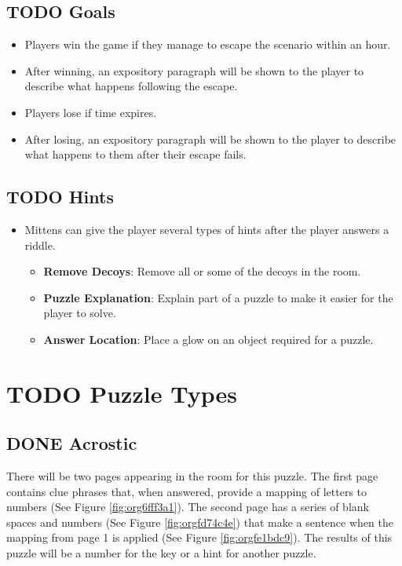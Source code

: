 \documentclass[11pt]{article}
\begin{document}
\subsection{{\bfseries\sffamily TODO} Goals}
\label{sec:org3f1af4b}
\begin{itemize}
\item Players win the game if they manage to escape the scenario within an hour.
\item After winning, an expository paragraph will be shown to the player to describe what happens following the escape.
\item Players lose if time expires.
\item After losing, an expository paragraph will be shown to the player to describe what happens to them after their escape fails.
\end{itemize}

\subsection{{\bfseries\sffamily TODO} Hints}
\label{sec:org89df1c5}
\begin{itemize}
\item Mittens can give the player several types of hints after the player answers a riddle.
\begin{itemize}
\item \textbf{Remove Decoys}: Remove all or some of the decoys in the room.
\item \textbf{Puzzle Explanation}: Explain part of a puzzle to make it easier for the player to solve.
\item \textbf{Answer Location}: Place a glow on an object required for a puzzle.
\end{itemize}
\end{itemize}

\section{{\bfseries\sffamily TODO} Puzzle Types}
\label{sec:org14efb35}
\subsection{{\bfseries\sffamily DONE} Acrostic}
\label{sec:org1eb99a7}
There will be two pages appearing in the room for this puzzle. The first page contains clue phrases that, when answered, provide a mapping of letters to numbers (See Figure \ref{fig:org6fff3a1}). The second page has a series of blank spaces and numbers (See Figure \ref{fig:orgfd74c4e}) that make a sentence when the mapping from page 1 is applied (See Figure \ref{fig:orgfe1bdc9}). The results of this puzzle will be a number for the key or a hint for another puzzle.
\end{document}

